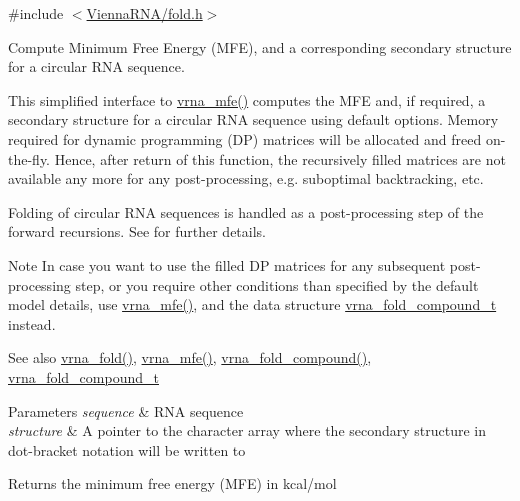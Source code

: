 {\ttfamily \#include $<$\hyperlink{fold_8h}{Vienna\+R\+N\+A/fold.\+h}$>$}



Compute Minimum Free Energy (M\+FE), and a corresponding secondary structure for a circular R\+NA sequence. 

This simplified interface to \hyperlink{group__mfe__fold_gabd3b147371ccf25c577f88bbbaf159fd}{vrna\+\_\+mfe()} computes the M\+FE and, if required, a secondary structure for a circular R\+NA sequence using default options. Memory required for dynamic programming (DP) matrices will be allocated and free\textquotesingle{}d on-\/the-\/fly. Hence, after return of this function, the recursively filled matrices are not available any more for any post-\/processing, e.\+g. suboptimal backtracking, etc.

Folding of circular R\+NA sequences is handled as a post-\/processing step of the forward recursions. See \cite{hofacker:2006} for further details.

\begin{DoxyNote}{Note}
In case you want to use the filled DP matrices for any subsequent post-\/processing step, or you require other conditions than specified by the default model details, use \hyperlink{group__mfe__fold_gabd3b147371ccf25c577f88bbbaf159fd}{vrna\+\_\+mfe()}, and the data structure \hyperlink{group__fold__compound_ga1b0cef17fd40466cef5968eaeeff6166}{vrna\+\_\+fold\+\_\+compound\+\_\+t} instead.
\end{DoxyNote}
\begin{DoxySeeAlso}{See also}
\hyperlink{group__mfe__fold__single_ga29a33b2895f4e67b0480271ff289afdc}{vrna\+\_\+fold()}, \hyperlink{group__mfe__fold_gabd3b147371ccf25c577f88bbbaf159fd}{vrna\+\_\+mfe()}, \hyperlink{group__fold__compound_ga6601d994ba32b11511b36f68b08403be}{vrna\+\_\+fold\+\_\+compound()}, \hyperlink{group__fold__compound_ga1b0cef17fd40466cef5968eaeeff6166}{vrna\+\_\+fold\+\_\+compound\+\_\+t}
\end{DoxySeeAlso}

\begin{DoxyParams}{Parameters}
{\em sequence} & R\+NA sequence \\
\hline
{\em structure} & A pointer to the character array where the secondary structure in dot-\/bracket notation will be written to \\
\hline
\end{DoxyParams}
\begin{DoxyReturn}{Returns}
the minimum free energy (M\+FE) in kcal/mol 
\end{DoxyReturn}
\mbox{\label{group__mfe__fold__single_ga2bc41df5d71fee6fd8da9904ee65d8fb}} 
